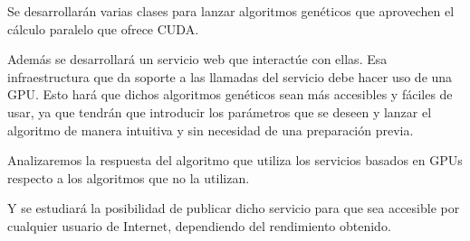 Se desarrollarán varias clases para lanzar algoritmos genéticos que aprovechen el cálculo paralelo que ofrece CUDA.

\bigskip
Además se desarrollará un servicio web que interactúe con ellas. Esa infraestructura que da soporte a las llamadas del servicio debe hacer uso de una GPU. Esto hará que dichos algoritmos genéticos sean más accesibles y fáciles de usar, ya que tendrán que introducir los parámetros que se deseen y lanzar el algoritmo de manera intuitiva y sin necesidad de una preparación previa.


\bigskip
Analizaremos la respuesta del algoritmo que utiliza los servicios basados en GPUs respecto a los algoritmos que no la utilizan.

\bigskip 
Y se estudiará la posibilidad de publicar dicho servicio para que sea accesible por cualquier usuario de Internet, dependiendo del rendimiento obtenido.










